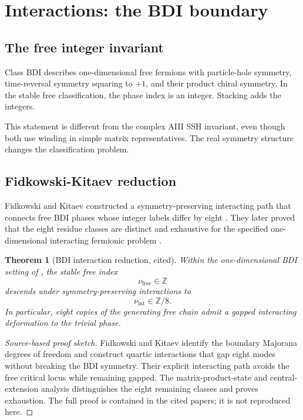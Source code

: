 \documentclass[12pt]{article}
\newtheorem{theorem}{Theorem}[section]
\theoremstyle{definition}
\theoremstyle{remark}
\newcommand{\Z}{\mathbb Z}
\begin{document}
\section{Interactions: the BDI boundary}

\subsection{The free integer invariant}

Class BDI describes one-dimensional free fermions with particle-hole symmetry,
time-reversal symmetry squaring to $+1$, and their product chiral symmetry.
In the stable free classification, the phase index is an integer.
Stacking adds the integers.

This statement is different from the complex AIII SSH invariant, even though
both use winding in simple matrix representatives.
The real symmetry structure changes the classification problem.

\subsection{Fidkowski-Kitaev reduction}

Fidkowski and Kitaev constructed a symmetry-preserving interacting path that
connects free BDI phases whose integer labels differ by eight
\cite{FidkowskiKitaev2009}.
They later proved that the eight residue classes are distinct and exhaustive
for the specified one-dimensional interacting fermionic problem
\cite{FidkowskiKitaev2011}.

\begin{theorem}[BDI interaction reduction, cited]
\label{thm:bdi-reduction}
Within the one-dimensional BDI setting of
\cite{FidkowskiKitaev2009,FidkowskiKitaev2011}, the stable free index
\[
\nu_{\mathrm{free}}\in\Z
\]
descends under symmetry-preserving interactions to
\[
\nu_{\mathrm{int}}\in\Z/8.
\]
In particular, eight copies of the generating free chain admit a gapped
interacting deformation to the trivial phase.
\end{theorem}

\begin{proof}[Source-based proof sketch]
Fidkowski and Kitaev identify the boundary Majorana degrees of freedom and
construct quartic interactions that gap eight modes without breaking the BDI
symmetry.
Their explicit interacting path avoids the free critical locus while
remaining gapped.
The matrix-product-state and central-extension analysis distinguishes the
eight remaining classes and proves exhaustion.
The full proof is contained in the cited papers; it is not reproduced here.
\end{proof}
\end{document}
